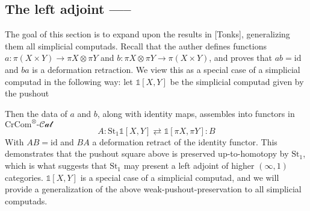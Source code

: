 \documentclass[12pt]{article}
\theoremstyle{definition}
\newcommand{\crcom}{\text{CrCom}}
\newcommand{\tensorcrossedcat}{\crcom^\otimes\text{-}\mathcal{Cat}}
\newcommand{\id}{\text{id}}
\begin{document}
	\subsection{The left adjoint -----}
	The goal of this section is to expand upon the results in [Tonks], generalizing them all simplicial computads. Recall that the auther defines functions $a: \pi(X \times Y) \to \pi X \otimes \pi Y$ and $b: \pi X \otimes \pi Y \to \pi (X \times Y) $, and proves that $ab = \id$ and $ba$ is a deformation retraction. We view this as a special case of a simplicial computad in the following way: let $\mathds{1}[X,Y]$ be the simplicial computad given by the pushout
	\begin{center}
	\end{center}
Then the data of $a$ and $b$, along with identity maps, assembles into functors in $\tensorcrossedcat$
$$A: \text{St}_1\mathds{1}[X,Y] \rightleftarrows \mathds{1}[\pi X, \pi Y]: B$$
With $AB = \id$ and $BA$ a deformation retract of the identity functor. This demonstrates that the pushout square above is preserved up-to-homotopy by $\text{St}_1$, which is what suggests that $\text{St}_1$ may present a left adjoint of higher $(\infty,1)$ categories. $\mathds{1}[X,Y]$ is a special case of a simplicial computad, and we will provide a generalization of the above weak-pushout-preservation to all simplicial computads. 
\\\\
\end{document}
